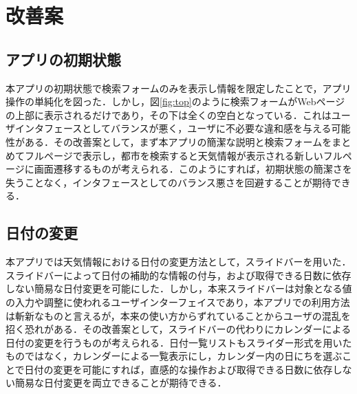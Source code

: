 \section{改善案}

\subsection{アプリの初期状態}
本アプリの初期状態で検索フォームのみを表示し情報を限定したことで，アプリ操作の単純化を図った．しかし，図\ref{fig:top}のように検索フォームがWebページの上部に表示されるだけであり，その下は全くの空白となっている．これはユーザインタフェースとしてバランスが悪く，ユーザに不必要な違和感を与える可能性がある．その改善案として，まず本アプリの簡潔な説明と検索フォームをまとめてフルページで表示し，都市を検索すると天気情報が表示される新しいフルページに画面遷移するものが考えられる．このようにすれば，初期状態の簡潔さを失うことなく，インタフェースとしてのバランス悪さを回避することが期待できる．

\subsection{日付の変更}
本アプリでは天気情報における日付の変更方法として，スライドバーを用いた．スライドバーによって日付の補助的な情報の付与，および取得できる日数に依存しない簡易な日付変更を可能にした．しかし，本来スライドバーは対象となる値の入力や調整に使われるユーザインターフェイスであり，本アプリでの利用方法は斬新なものと言えるが，本来の使い方からずれていることからユーザの混乱を招く恐れがある．その改善案として，スライドバーの代わりにカレンダーによる日付の変更を行うものが考えられる．日付一覧リストもスライダー形式を用いたものではなく，カレンダーによる一覧表示にし，カレンダー内の日にちを選ぶことで日付の変更を可能にすれば，直感的な操作および取得できる日数に依存しない簡易な日付変更を両立できることが期待できる．


